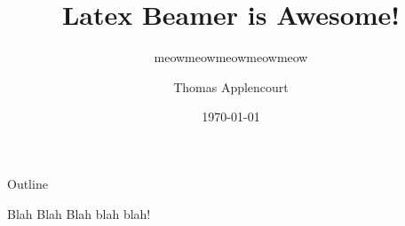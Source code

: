 \documentclass[10pt,aspectratio=169]{beamer}
\title{Latex Beamer is Awesome!}
\subtitle{meowmeowmeowmeowmeow}
\date{\today}
\author{Thomas Applencourt}
\begin{document}
\begin{frame}
\maketitle
\end{frame}

\begin{frame}{Outline}
\tableofcontents[subsectionstyle=show/show/show]
\end{frame}

\begin{frame}{Blah Blah}
	Blah blah blah!
\end{frame}
\end{document}

